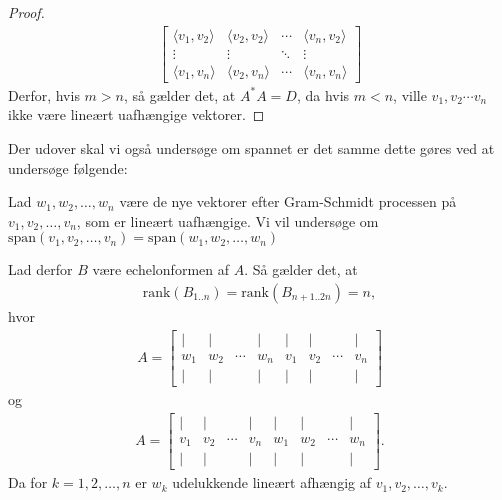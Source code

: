 \begin{proof}
\begin{gather}
\begin{bmatrix}
            \langle v_1, v_2 \rangle & \langle v_2, v_2 \rangle & \cdots & \langle v_n, v_2 \rangle \\
            \vdots & \vdots & \ddots & \vdots \\
            \langle v_1, v_n \rangle & \langle v_2, v_n \rangle & \cdots & \langle v_n, v_n \rangle
        \end{bmatrix}
    \end{gather}
    Derfor, hvis \( m > n \), så gælder det, at \( A^*A = D \), da hvis \( m < n \), ville $v_1, v_2 \cdots v_n$ ikke være lineært uafhængige vektorer.
\end{proof}

Der udover skal vi også undersøge om spannet er det samme dette gøres ved at undersøge følgende:

\vspace{0.5cm}
\begin{theorem}
    Lad $w_1, w_2, \ldots, w_n$ være de nye vektorer efter Gram-Schmidt processen på $v_1, v_2, \ldots, v_n$, som er lineært uafhængige. 
    Vi vil undersøge om  $\text{span}(v_1, v_2, \ldots, v_n) = \text{span}(w_1, w_2, \ldots, w_n)$ 

    Lad derfor $B$ være echelonformen af $A$. Så gælder det, at
    \begin{gather}
        \text{rank}(B_{1..n}) = \text{rank}(B_{n+1..2n}) = n,
    \end{gather}
    hvor 
    \begin{gather}
        A = 
        \begin{bmatrix}
            | & | &  & | & | & | &  & | \\
            w_1 & w_2 & \cdots & w_n & v_1 & v_2 & \cdots & v_n \\
            | & | &  & | & | & | &  & |
        \end{bmatrix}
    \end{gather}
    og
    \begin{gather}
        A = 
        \begin{bmatrix}
            | & | &  & | & | & | &  & | \\
            v_1 & v_2 & \cdots & v_n & w_1 & w_2 & \cdots & w_n \\
            | & | &  & | & | & | &  & |
        \end{bmatrix}.
    \end{gather}
    Da for $k = 1, 2, \ldots, n$ er $w_k$ udelukkende lineært afhængig af $v_1, v_2, \ldots, v_k$.
\end{theorem}


